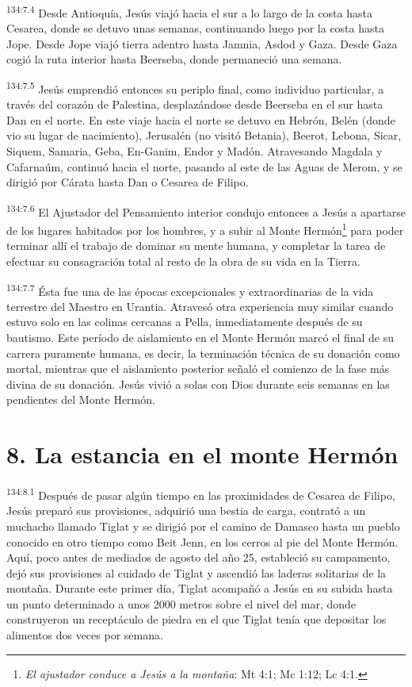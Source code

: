 \par 
\textsuperscript{134:7.4} Desde Antioquía, Jesús viajó hacia el sur a lo largo de la costa hasta Cesarea, donde se detuvo unas semanas, continuando luego por la costa hasta Jope. Desde Jope viajó tierra adentro hasta Jamnia, Asdod y Gaza. Desde Gaza cogió la ruta interior hasta Beerseba, donde permaneció una semana.

\par 
\textsuperscript{134:7.5} Jesús emprendió entonces su periplo final, como individuo particular, a través del corazón de Palestina, desplazándose desde Beerseba en el sur hasta Dan en el norte. En este viaje hacia el norte se detuvo en Hebrón, Belén (donde vio su lugar de nacimiento), Jerusalén (no visitó Betania), Beerot, Lebona, Sicar, Siquem, Samaria, Geba, En-Ganim, Endor y Madón. Atravesando Magdala y Cafarnaúm, continuó hacia el norte, pasando al este de las Aguas de Merom, y se dirigió por Cárata hasta Dan o Cesarea de Filipo.

\par 
\textsuperscript{134:7.6} El Ajustador del Pensamiento interior condujo entonces a Jesús a apartarse de los lugares habitados por los hombres, y a subir al Monte Hermón\footnote{\textit{El ajustador conduce a Jesús a la montaña}: Mt 4:1; Mc 1:12; Lc 4:1.} para poder terminar allí el trabajo de dominar su mente humana, y completar la tarea de efectuar su consagración total al resto de la obra de su vida en la Tierra.

\par 
\textsuperscript{134:7.7} Ésta fue una de las épocas excepcionales y extraordinarias de la vida terrestre del Maestro en Urantia. Atravesó otra experiencia muy similar cuando estuvo solo en las colinas cercanas a Pella, inmediatamente después de su bautismo. Este período de aislamiento en el Monte Hermón marcó el final de su carrera puramente humana, es decir, la terminación técnica de su donación como mortal, mientras que el aislamiento posterior señaló el comienzo de la fase más divina de su donación. Jesús vivió a solas con Dios durante seis semanas en las pendientes del Monte Hermón.

\section*{8. La estancia en el monte Hermón}
\par 
\textsuperscript{134:8.1} Después de pasar algún tiempo en las proximidades de Cesarea de Filipo, Jesús preparó sus provisiones, adquirió una bestia de carga, contrató a un muchacho llamado Tiglat y se dirigió por el camino de Damasco hasta un pueblo conocido en otro tiempo como Beit Jenn, en los cerros al pie del Monte Hermón. Aquí, poco antes de mediados de agosto del año 25, estableció su campamento, dejó sus provisiones al cuidado de Tiglat y ascendió las laderas solitarias de la montaña. Durante este primer día, Tiglat acompañó a Jesús en su subida hasta un punto determinado a unos 2000 metros sobre el nivel del mar, donde construyeron un receptáculo de piedra en el que Tiglat tenía que depositar los alimentos dos veces por semana.

